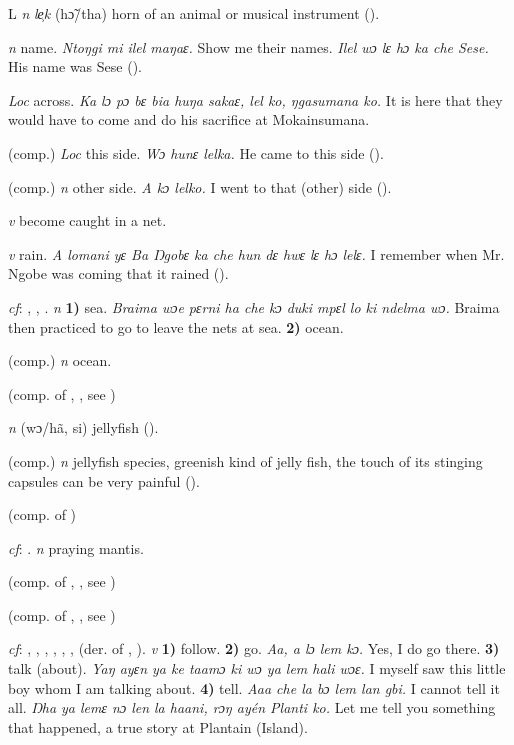 \begin{letter}{L}
 \textit{n} \textit{le̹k} (hɔ̃/tha) horn of an animal or musical instrument (\citealt{Pichl1967}). 

 \textit{n} name. \textit{Ntoŋgi mi ilel maŋaɛ.} Show me their names. \textit{Ilel wɔ lɛ hɔ ka che Sese.} His name was Sese (\citealt{Pichl1967}). 

 \textit{Loc} across. \textit{Ka lɔ pɔ bɛ bia huŋa sakaɛ, lel ko, ŋgasumana ko.} It is here that they would have to come and do his sacrifice at Mokainsumana.

 (comp.) \textit{Loc} this side. \textit{Wɔ hunɛ lelka.} He came to this side (\citealt{Pichl1967}). 

 (comp.) \textit{n} other side. \textit{A kɔ lelko.} I went to that (other) side (\citealt{Pichl1967}).

 \textit{v} become caught in a net.

 \textit{v} rain. \textit{A lomani yɛ Ba Ŋgobɛ ka che hun dɛ hwɛ lɛ hɔ lelɛ.} I remember when Mr. Ngobe was coming that it rained (\citealt{Pichl1967}).

 \textit{cf}: , , . \textit{n} \textbf{1)} sea. \textit{Braima wɔe pɛrni ha che kɔ duki mpɛl lo ki ndelma wɔ.} Braima then practiced to go to leave the nets at sea. \textbf{2)} ocean.

 (comp.) \textit{n} ocean.

 (comp. of , , see ) 

 \textit{n} (wɔ/hã, si) jellyfish (\citealt{Pichl1967}). 

 (comp.) \textit{n} jellyfish species, greenish kind of jelly fish, the touch of its stinging capsules can be very painful (\citealt{Pichl1967}). 

 (comp. of ) 

 \textit{cf}: . \textit{n} praying mantis.

 (comp. of , , see ) 

 (comp. of , , see ) 

 \textit{cf}: , , , , , ,  (der. of , ). \textit{v} \textbf{1)} follow. \textbf{2)} go. \textit{Aa, a lɔ lem kɔ.} Yes, I do go there. \textbf{3)} talk (about). \textit{Yaŋ ayɛn ya ke taamɔ ki wɔ ya lem hali wɔɛ.} I myself saw this little boy whom I am talking about. \textbf{4)} tell. \textit{Aaa che la bɔ lem lan gbi.} I cannot tell it all. \textit{Ŋha ya lemɛ nɔ len la haani, rɔŋ ayén Planti ko.} Let me tell you something that happened, a true story at Plantain (Island). 


\end{letter}
